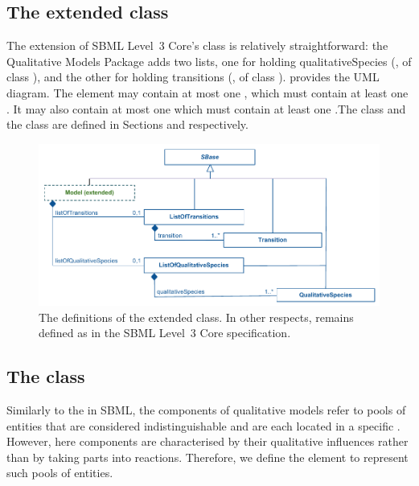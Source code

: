 \subsection{The extended  class}
\label{model-class}

The extension of SBML Level~3 Core's \Model class is relatively
straightforward: the Qualitative Models Package adds two lists,
one for holding qualitativeSpecies (, of class
\ListOfQualitativeSpecies), and the other for holding transitions (,
of class \ListOfTransitions).  \fig{} provides the UML
diagram.  The  element may contain at most one , which must contain at least one . It may also contain at most one  which must contain at least one .The \QualitativeSpecies class and
the \Transition  class are defined in Sections  and  respectively.

\begin{figure}
  \includegraphics{figs/qual-extended-model-uml.pdf}
  \caption{The definitions of the extended \Model class. In other respects, \Model remains defined as
    in the SBML Level~3 Core specification.}
  \label{qual-extended-model-uml}
\end{figure}


\subsection{The  class}
\label{qualSpecies-class}
Similarly to the  in SBML, the components of qualitative models refer to pools of entities that are considered indistinguishable and are each located in a specific . However, here components are characterised by their qualitative influences rather than by taking parts into reactions. Therefore, we define the \QualitativeSpecies element to represent such pools of entities.

